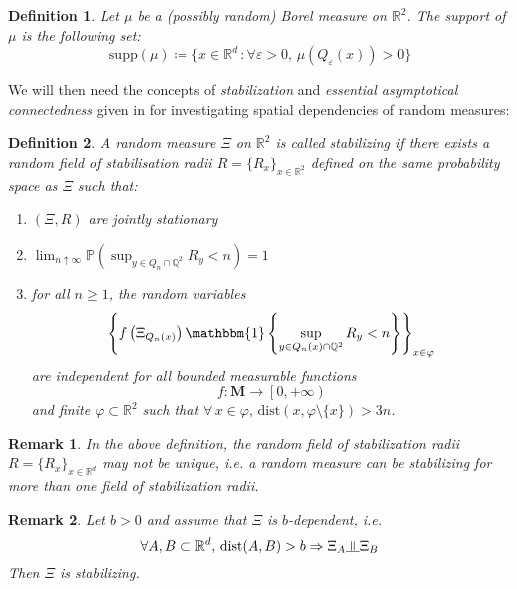 \documentclass[11pt,a4paper]{amsart}
\theoremstyle{exampstyle}
\newtheorem{Definition}{Definition}
\newtheorem{Remark}{Remark}
\theoremstyle{exampnotations}
\newcommand{\indep}{\rotatebox[origin=c]{90}{$\models$}}
\begin{document}
\begin{Definition}
Let $\mu$ be a (possibly random) Borel measure on $\mathbb{R}^{2}$. The \emph{support} of $\mu$ is the following set:
$$\text{supp}(\mu) \coloneqq \lbrace x \in \mathbb{R}^{d} \, : \forall \varepsilon > 0, \,  \mu(Q_{\varepsilon}(x)) > 0 \rbrace$$
\end{Definition}
We will then need the concepts of \emph{stabilization} and \emph{essential asymptotical connectedness} given in \cite{hirsch_continuum_2017} for investigating spatial dependencies of random measures:

\begin{Definition}
A random measure $\Xi$ on $\mathbb{R}^{2}$ is called \emph{stabilizing} if there exists a random field of stabilisation radii $R = \lbrace R_{x} \rbrace _{x \in \mathbb{R}^{2}}$ defined on the same probability space as $\Xi$ such that:
\begin{enumerate}[label = (\arabic*)]
\item $(\Xi,R)$ are jointly stationary
\item $\displaystyle \lim_{n \uparrow \infty} \mathbb{P}(\sup _{y \in Q_{n} \cap \mathbb{Q}^{2}} R_{y} < n) = 1$
\item for all $n \geq 1$, the random variables 
$$ \left\lbrace f\left(\Xi_{Q_{n}(x)}\right)\mathbbm{1}\left\lbrace \sup_{y \in Q_{n}(x) \cap \mathbb{Q}^{2}} R_{y} < n \right\rbrace \right\rbrace _{x \in \varphi}$$
are independent for all bounded measurable functions $$f : \mathbf{M} \to \left[0, +\infty \right)$$ and finite $\varphi \subset \mathbb{R}^{2}$ such that $\forall \, x \in \varphi, \, \text{dist}(x, \varphi \setminus \lbrace x \rbrace ) > 3n$.
\end{enumerate}
\end{Definition}

\begin{Remark}
In the above definition, the random field of stabilization radii $R = \lbrace R_{x} \rbrace _{x \in \mathbb{R}^{d}}$ may not be unique, i.e. a random measure can be stabilizing for more than one field of stabilization radii.
\end{Remark}
\begin{Remark}
Let $b > 0$ and assume that $\Xi$ is $b$-dependent, i.e. $$\forall A,B \subset \mathbb{R}^{d}, \, \text{dist}(A,B) > b \Rightarrow \Xi_{A} \indep \Xi_{B}$$ Then $\Xi$ is stabilizing. 
\end{Remark} 
\end{document}
